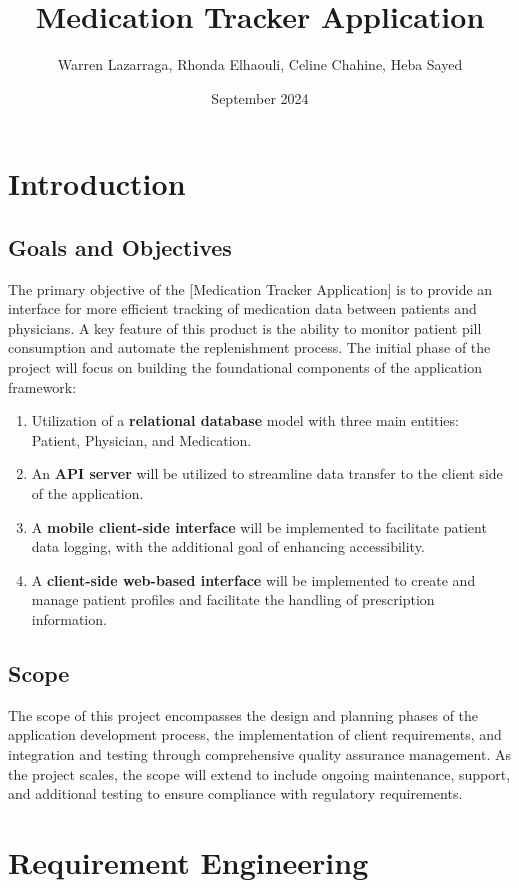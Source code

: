 \documentclass{article}
\title{Medication Tracker Application}
\author{Warren Lazarraga, Rhonda Elhaouli, Celine Chahine, Heba Sayed}
\date{September 2024}
\begin{document}
\maketitle

\section{Introduction}

\subsection{Goals and Objectives}
The primary objective of the [Medication Tracker Application] is to provide an interface for more efficient tracking of medication data between patients and physicians. A key feature of this product is the ability to monitor patient pill consumption and automate the replenishment process. The initial phase of the project will focus on building the foundational components of the application framework:
\begin{enumerate}
    \item Utilization of a \textbf{relational database} model with three main entities: Patient, Physician, and Medication.
    \item An \textbf{API server} will be utilized to streamline data transfer to the client side of the application.
    \item A \textbf{mobile client-side interface} will be implemented to facilitate patient data logging, with the additional goal of enhancing accessibility.
    \item A \textbf{client-side web-based interface} will be implemented to create and manage patient profiles and facilitate the handling of prescription information.

\end{enumerate}

\subsection{Scope}
The scope of this project encompasses the design and planning phases of the application development process, the implementation of client requirements, and integration and testing through comprehensive quality assurance management. As the project scales, the scope will extend to include ongoing maintenance, support, and additional testing to ensure compliance with regulatory requirements.

\section{Requirement Engineering}
\end{document}
